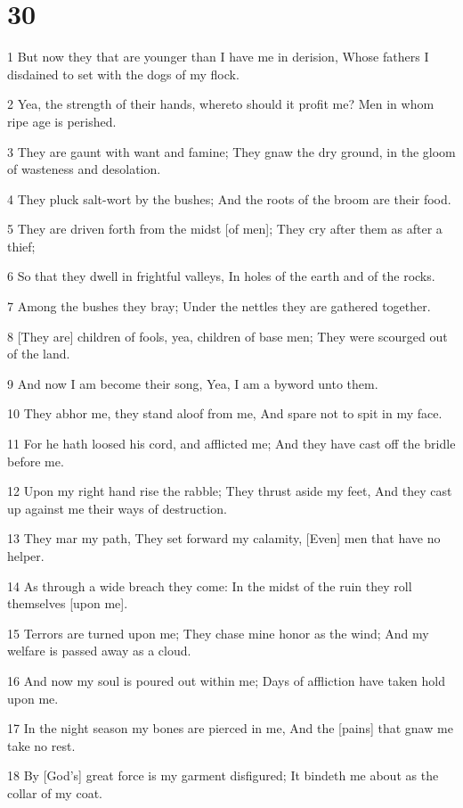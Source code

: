 \chapter{30}

\par 1 But now they that are younger than I have me in derision, Whose fathers I disdained to set with the dogs of my flock.
\par 2 Yea, the strength of their hands, whereto should it profit me? Men in whom ripe age is perished.
\par 3 They are gaunt with want and famine; They gnaw the dry ground, in the gloom of wasteness and desolation.
\par 4 They pluck salt-wort by the bushes; And the roots of the broom are their food.
\par 5 They are driven forth from the midst [of men]; They cry after them as after a thief;
\par 6 So that they dwell in frightful valleys, In holes of the earth and of the rocks.
\par 7 Among the bushes they bray; Under the nettles they are gathered together.
\par 8 [They are] children of fools, yea, children of base men; They were scourged out of the land.
\par 9 And now I am become their song, Yea, I am a byword unto them.
\par 10 They abhor me, they stand aloof from me, And spare not to spit in my face.
\par 11 For he hath loosed his cord, and afflicted me; And they have cast off the bridle before me.
\par 12 Upon my right hand rise the rabble; They thrust aside my feet, And they cast up against me their ways of destruction.
\par 13 They mar my path, They set forward my calamity, [Even] men that have no helper.
\par 14 As through a wide breach they come: In the midst of the ruin they roll themselves [upon me].
\par 15 Terrors are turned upon me; They chase mine honor as the wind; And my welfare is passed away as a cloud.
\par 16 And now my soul is poured out within me; Days of affliction have taken hold upon me.
\par 17 In the night season my bones are pierced in me, And the [pains] that gnaw me take no rest.
\par 18 By [God's] great force is my garment disfigured; It bindeth me about as the collar of my coat.

